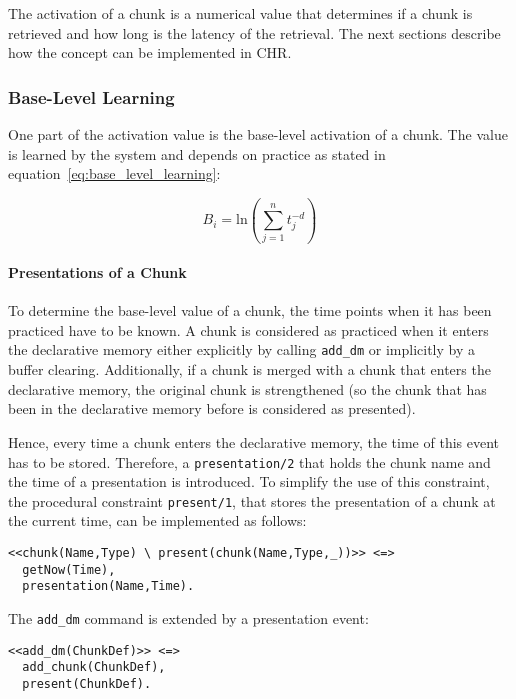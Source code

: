The activation of a chunk is a numerical value that determines if a chunk is retrieved and how long is the latency of the retrieval. The next sections describe how the concept can be implemented in CHR.

\subsubsection{Base-Level Learning}

One part of the activation value is the base-level activation of a chunk. The value is learned by the system and depends on practice as stated in equation~\eqref{eq:base_level_learning}:

\begin{equation*}
B_i = \mathrm{ln}\left(\sum_{j=1}^n{t_j^{-d}}\right) 
\end{equation*}

\paragraph{Presentations of a Chunk} 

To determine the base-level value of a chunk, the time points when it has been practiced have to be known. A chunk is considered as practiced when it enters the declarative memory either explicitly by calling \verb|add_dm| or implicitly by a buffer clearing. Additionally, if a chunk is merged with a chunk that enters the declarative memory, the original chunk is strengthened (so the chunk that has been in the declarative memory before is considered as presented). 

Hence, every time a chunk enters the declarative memory, the time of this event has to be stored. Therefore, a \verb|presentation/2| that holds the chunk name and the time of a presentation is introduced. To simplify the use of this constraint, the procedural constraint \verb|present/1|, that stores the presentation of a chunk at the current time, can be implemented as follows:

\begin{lstlisting}
<<chunk(Name,Type) \ present(chunk(Name,Type,_))>> <=> 
  getNow(Time),
  presentation(Name,Time).
\end{lstlisting}

The \verb|add_dm| command is extended by a presentation event:

\begin{lstlisting}
<<add_dm(ChunkDef)>> <=> 
  add_chunk(ChunkDef), 
  present(ChunkDef). 
\end{lstlisting}

